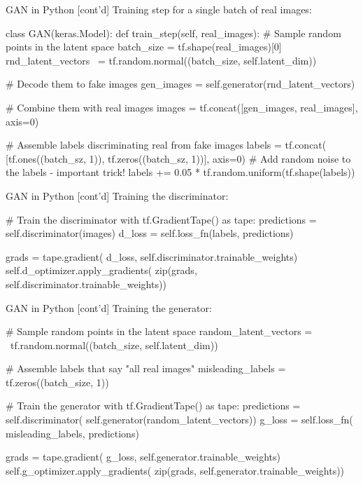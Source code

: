 \documentclass[ignorenonframetext,xcolor=x11names]{beamer}
\begin{document}
\begin{frame}[fragile]{GAN in Python \small [cont'd]}
Training step for a single batch of real images:
\begin{pythoncode}
class GAN(keras.Model):
    def train_step(self, real_images):
        # Sample random points in the latent space
        batch_size = tf.shape(real_images)[0]
        rnd_latent_vectors \
            = tf.random.normal((batch_size, self.latent_dim))

        # Decode them to fake images
        gen_images = self.generator(rnd_latent_vectors)

        # Combine them with real images
        images = tf.concat([gen_images, real_images], axis=0)

        # Assemble labels discriminating real from fake images
        labels = tf.concat(
            [tf.ones((batch_sz, 1)), 
            tf.zeros((batch_sz, 1))], axis=0)
        # Add random noise to the labels - important trick!
        labels += 0.05 * tf.random.uniform(tf.shape(labels))
\end{pythoncode}
\end{frame}

\begin{frame}[fragile]{GAN in Python \small [cont'd]}
Training the discriminator:
\begin{pythoncode}
        # Train the discriminator
        with tf.GradientTape() as tape:
            predictions = self.discriminator(images)
            d_loss = self.loss_fn(labels, predictions)
            
        grads = tape.gradient(
            d_loss, 
            self.discriminator.trainable_weights)
        self.d_optimizer.apply_gradients(
            zip(grads, self.discriminator.trainable_weights))
\end{pythoncode}
\end{frame}

\begin{frame}[fragile]{GAN in Python \small [cont'd]}
Training the generator:
\begin{pythoncode}
        # Sample random points in the latent space
        random_latent_vectors = \
            tf.random.normal((batch_size, self.latent_dim))

        # Assemble labels that say "all real images"
        misleading_labels = tf.zeros((batch_size, 1))

        # Train the generator 
        with tf.GradientTape() as tape:
            predictions = self.discriminator(
                self.generator(random_latent_vectors))
            g_loss = self.loss_fn(
                misleading_labels, predictions)

        grads = tape.gradient(
            g_loss, 
            self.generator.trainable_weights)
        self.g_optimizer.apply_gradients(
            zip(grads, self.generator.trainable_weights))
\end{pythoncode}
\end{frame}
\end{document}
